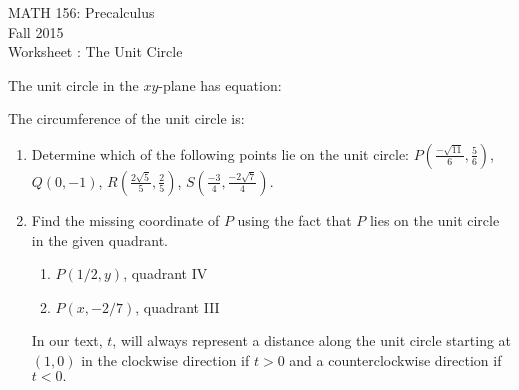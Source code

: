 \documentclass[11pt]{article}
\newcommand{\sect}{\textsection}
\begin{document}
 

\begin{center}MATH 156: Precalculus  \\ Fall 2015 \\ Worksheet \sect 5.1: The Unit Circle\end{center}

\hrulefill

The unit circle in the $xy$-plane has equation: \\
\vspace{.5in}

The circumference of the unit circle is: \\
\vspace{0.5in}

\hrulefill

\begin{enumerate}
\item Determine which of the following points lie on the unit circle: $P(\frac{-\sqrt{11}}{6},\frac{5}{6})$, $Q(0,-1)$, $R(\frac{2\sqrt{5}}{5},\frac{2}{5})$, $S(\frac{-3}{4},\frac{-2\sqrt{7}}{4}).$
\vfill

\item Find the missing coordinate of $P$ using the fact that $P$ lies on the unit circle in the given quadrant.\\
\begin{enumerate}
\item $P(1/2, y)$, quadrant IV\\
\vspace{.5in}
\item $P(x,-2/7)$, quadrant III
\vspace{.5in}
\end{enumerate}

\hrulefill

In our text, $t$, will always represent a distance along the unit circle starting at $(1,0)$ in the clockwise direction if $t>0$ and a counterclockwise direction if $t<0.$

\quad
{}
\quad
{}
\newpage


\end{enumerate}
\end{document}
